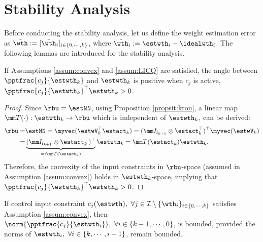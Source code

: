 \documentclass[lettersize,journal]{IEEEtran}
\begin{document}
\section{Stability Analysis}\label{sec:stability}

Before conducting the stability analysis, let us define the weight estimation error as $\tilde\wth:= [\tilde\wth_i]_{i\in\{0,\cdots,k\}}$, where $\tilde\wth_i:=\estwth_i-\idealwth_i$.
The following lemmas are introduced for the stability analysis. 

\begin{lem}
    If Assumptions \ref{assum:convex} and \ref{assum:LICQ} are satisfied, the angle between $\pptfrac{c_j}{\estwth_k}$ and $\estwth_k$ is positive when $c_j$ is active, \ie $\pptfrac{c_j}{\estwth_k}^\top\estwth_k>0$.
    \label{lem:convex:angle}
\end{lem}

\begin{proof}

Since $\rbu = \estNN$, using Proposition \ref{propsit:kron}, a linear map $\mm T(\cdot):\estwth_k\to\rbu$ which is independent of $\estwth_k$, can be derived: 
\begin{equation}\label{eq:linear:map}
    \begin{aligned}
    \rbu 
    = 
    &
    \estNN 
    =
    \myvec(
        \estwV_k^\top \estact_k
    ) 
    = 
    (
        \mm I_{l_{k+1}}
        \otimes 
        \estact_k^\top
    )^\top
    \myvec(\estwV_k)
    \\
    = &
    \underbrace{
        (
        \mm I_{l_{k+1}}
        \otimes 
        \estact_k^\top
    )^\top}_{=:\mm T(\estact_k)}
    \estwth_k 
    =
    \mm T(\estact_k) \estwth_k.
    \end{aligned}
\end{equation}
Therefore, the convexity of the input constraints in $\rbu$-space (assumed in Assumption \ref{assum:convex}) holds in $\estwth_k$-space, implying
that $\pptfrac{c_j}{\estwth_k}^\top\estwth_k>0$.

\end{proof}

\begin{lem} 
    If control input constraint $c_j(\estwth),\ \forall j\in\mathcal I \setminus \{\wth_i\}_{i\in\{0,\cdots,k\}}$ satisfies Assumption \ref{assum:convex}, then $\norm{\pptfrac{c_j}{\estwth_i}},\ \forall i\in\{k-1,\cdots, 0\}$, is bounded, provided the norms of $\estwth_i,\ \forall i\in\{k,\cdots, i+1\}$, remain bounded.
    \label{lem:cstr:grad:bound}
\end{lem}
\end{document}
